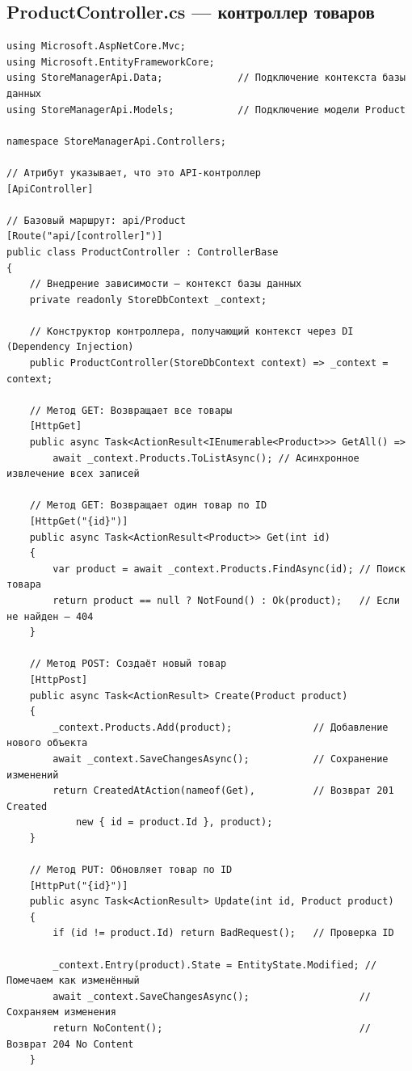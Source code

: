 \documentclass[12pt]{article}
\renewcommand{\texttt}[1]{{\small\ttfamily #1}}
\newenvironment{code}{\captionsetup{type=listing}}{}
\numberwithin{listing}{section}
\numberwithin{figure}{section}
\begin{document}
\subsection{\texttt{ProductController.cs} — контроллер товаров }
\begin{code}
	\begin{verbatim}
using Microsoft.AspNetCore.Mvc;
using Microsoft.EntityFrameworkCore;
using StoreManagerApi.Data;             // Подключение контекста базы данных
using StoreManagerApi.Models;           // Подключение модели Product

namespace StoreManagerApi.Controllers;

// Атрибут указывает, что это API-контроллер
[ApiController]

// Базовый маршрут: api/Product
[Route("api/[controller]")]
public class ProductController : ControllerBase
{
    // Внедрение зависимости — контекст базы данных
    private readonly StoreDbContext _context;

    // Конструктор контроллера, получающий контекст через DI (Dependency Injection)
    public ProductController(StoreDbContext context) => _context = context;

    // Метод GET: Возвращает все товары
    [HttpGet]
    public async Task<ActionResult<IEnumerable<Product>>> GetAll() =>
        await _context.Products.ToListAsync(); // Асинхронное извлечение всех записей

    // Метод GET: Возвращает один товар по ID
    [HttpGet("{id}")]
    public async Task<ActionResult<Product>> Get(int id)
    {
        var product = await _context.Products.FindAsync(id); // Поиск товара
        return product == null ? NotFound() : Ok(product);   // Если не найден — 404
    }

    // Метод POST: Создаёт новый товар
    [HttpPost]
    public async Task<ActionResult> Create(Product product)
    {
        _context.Products.Add(product);              // Добавление нового объекта
        await _context.SaveChangesAsync();           // Сохранение изменений
        return CreatedAtAction(nameof(Get),          // Возврат 201 Created
            new { id = product.Id }, product);
    }

    // Метод PUT: Обновляет товар по ID
    [HttpPut("{id}")]
    public async Task<ActionResult> Update(int id, Product product)
    {
        if (id != product.Id) return BadRequest();   // Проверка ID

        _context.Entry(product).State = EntityState.Modified; // Помечаем как изменённый
        await _context.SaveChangesAsync();                   // Сохраняем изменения
        return NoContent();                                  // Возврат 204 No Content
    }


\end{verbatim}
\end{code}
\end{document}
